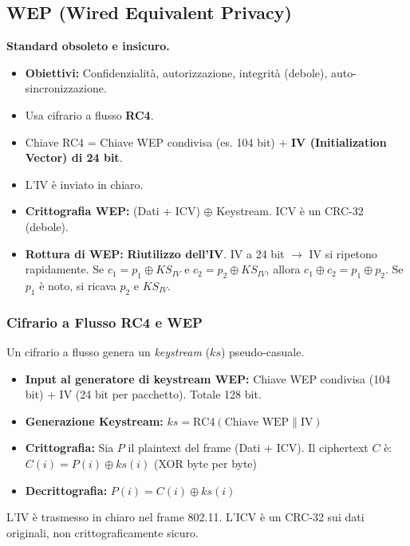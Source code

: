 \subsection{WEP (Wired Equivalent Privacy)}
\textbf{Standard obsoleto e insicuro.}
\begin{itemize}
    \item \textbf{Obiettivi:} Confidenzialità, autorizzazione, integrità (debole), auto-sincronizzazione.
    \item Usa cifrario a flusso \textbf{RC4}.
    \item Chiave RC4 = Chiave WEP condivisa (es. 104 bit) + \textbf{IV (Initialization Vector) di 24 bit}.
    \item L'IV è inviato in chiaro.
    \item \textbf{Crittografia WEP:} (Dati + ICV) $\oplus$ Keystream. ICV è un CRC-32 (debole).
    \item \textbf{Rottura di WEP:} \textbf{Riutilizzo dell'IV}. IV a 24 bit $\rightarrow$ IV si ripetono rapidamente.
    Se $c_1 = p_1 \oplus KS_{IV}$ e $c_2 = p_2 \oplus KS_{IV}$, allora $c_1 \oplus c_2 = p_1 \oplus p_2$.
    Se $p_1$ è noto, si ricava $p_2$ e $KS_{IV}$.
\end{itemize}

\subsubsection{Cifrario a Flusso RC4 e WEP}
\label{ssubsec:wep_rc4_stream}
Un cifrario a flusso genera un \textit{keystream} ($ks$) pseudo-casuale.
\begin{itemize}
    \item \textbf{Input al generatore di keystream WEP:} Chiave WEP condivisa (104 bit) + IV (24 bit per pacchetto). Totale 128 bit.
    \item \textbf{Generazione Keystream:} $ks = \text{RC4}(\text{Chiave WEP} \| \text{IV})$
    \item \textbf{Crittografia:} Sia $P$ il plaintext del frame (Dati + ICV). Il ciphertext $C$ è:
    $C(i) = P(i) \oplus ks(i)$ (XOR byte per byte)
    \item \textbf{Decrittografia:} $P(i) = C(i) \oplus ks(i)$
\end{itemize}
L'IV è trasmesso in chiaro nel frame 802.11. L'ICV è un CRC-32 sui dati originali, non crittograficamente sicuro.

